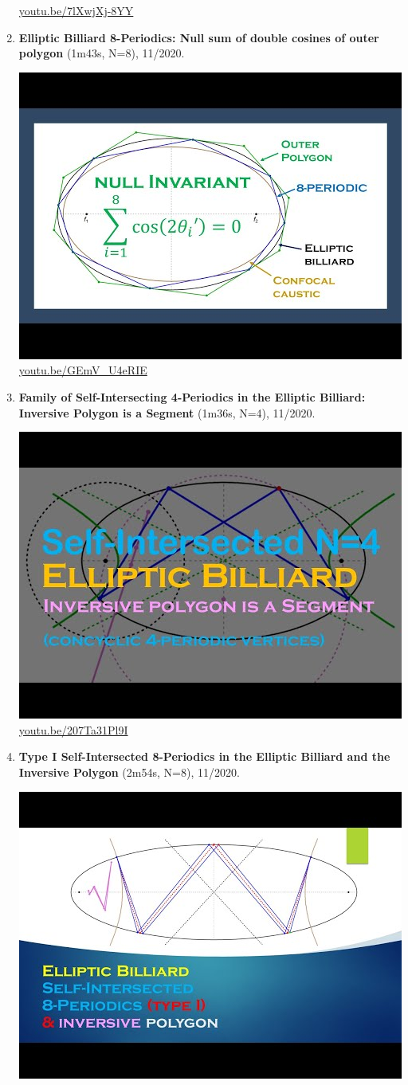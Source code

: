 \documentclass[12pt]{amsart}
\begin{document}
\begin{enumerate}[resume]
\begin{center}
\href{https://youtu.be/7lXwjXj-8YY}{\url{youtu.be/7lXwjXj-8YY}}\end{center}
% 
\item \textbf{Elliptic Billiard 8-Periodics: Null sum of double cosines of outer polygon} (1m43s, N=8), 11/2020. 
\begin{center}\includegraphics[width=.5\textwidth]{pics/GEmV_U4eRIE.jpg} \\ 
\href{https://youtu.be/GEmV_U4eRIE}{\url{youtu.be/GEmV\_U4eRIE}}\end{center}
% 
\item \textbf{Family of Self-Intersecting 4-Periodics in the Elliptic Billiard: Inversive Polygon is a Segment} (1m36s, N=4), 11/2020. 
\begin{center}\includegraphics[width=.5\textwidth]{pics/207Ta31Pl9I.jpg} \\ 
\href{https://youtu.be/207Ta31Pl9I}{\url{youtu.be/207Ta31Pl9I}}\end{center}
% 
\item \textbf{Type I Self-Intersected 8-Periodics in the Elliptic Billiard and the Inversive Polygon} (2m54s, N=8), 11/2020. 
\begin{center}\includegraphics[width=.5\textwidth]{pics/5Lt9atsZhRs.jpg} \\ 

\end{center}
\end{enumerate}
\end{document}
